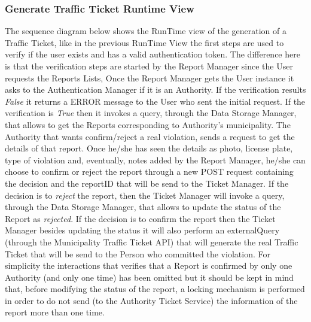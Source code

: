 \subsubsection{Generate Traffic Ticket Runtime View}
The sequence diagram below shows the RunTime view of the generation of a Traffic Ticket, like in the previous RunTime View the first steps are used to verify if the user exists and has a valid authentication token. The difference here is that the verification steps are started by the Report Manager since the User requests the Reports Lists, Once the Report Manager gets the User instance it asks to the Authentication Manager if it is an Authority. If the verification results \textit{False} it returns a ERROR message to the User who sent the initial request. If the verification is \textit{True} then it invokes a query, through the Data Storage Manager, that allows to get the Reports corresponding to Authority's municipality.\newline
The Authority that wants confirm/reject a real violation, sends a request to get the details of that report. Once he/she has seen the details as photo, license plate, type of violation and, eventually, notes added by the Report Manager, he/she can choose to confirm or reject the report through a new POST request containing the decision and the reportID that will be send to the Ticket Manager.\newline
If the decision is to \textit{reject} the report, then the Ticket Manager will invoke a query, through the Data Storage Manager, that allows to update the status of the Report as \textit{rejected}. If the decision is to confirm the report then the Ticket Manager besides updating the status it will also perform an externalQuery (through the Municipality Traffic Ticket API) that will generate the real Traffic Ticket that will be send to the Person who committed the violation.\newline 
For simplicity the interactions that verifies that a Report is confirmed by only one Authority (and only one time) has been omitted but it should be kept in mind that, before modifying the status of the report, a locking mechanism is performed in order to do not send (to the Authority Ticket Service) the information of the report more than one time.\newline
